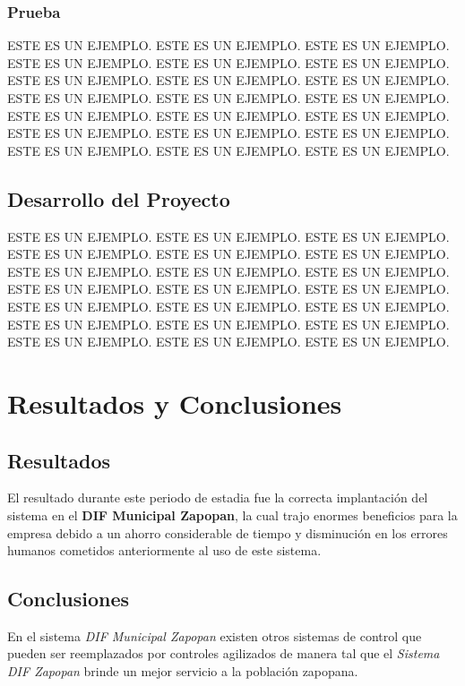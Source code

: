 \documentclass[12pt,spanish]{report}
\begin{document}
\subsection{Prueba}
ESTE ES UN EJEMPLO. ESTE ES UN EJEMPLO. ESTE ES UN EJEMPLO.
ESTE ES UN EJEMPLO. ESTE ES UN EJEMPLO. ESTE ES UN EJEMPLO.
ESTE ES UN EJEMPLO. ESTE ES UN EJEMPLO. ESTE ES UN EJEMPLO.
ESTE ES UN EJEMPLO. ESTE ES UN EJEMPLO. ESTE ES UN EJEMPLO.
ESTE ES UN EJEMPLO. ESTE ES UN EJEMPLO. ESTE ES UN EJEMPLO.
ESTE ES UN EJEMPLO. ESTE ES UN EJEMPLO. ESTE ES UN EJEMPLO.
ESTE ES UN EJEMPLO. ESTE ES UN EJEMPLO. ESTE ES UN EJEMPLO.

\section{Desarrollo del Proyecto}
ESTE ES UN EJEMPLO. ESTE ES UN EJEMPLO. ESTE ES UN EJEMPLO.
ESTE ES UN EJEMPLO. ESTE ES UN EJEMPLO. ESTE ES UN EJEMPLO.
ESTE ES UN EJEMPLO. ESTE ES UN EJEMPLO. ESTE ES UN EJEMPLO.
ESTE ES UN EJEMPLO. ESTE ES UN EJEMPLO. ESTE ES UN EJEMPLO.
ESTE ES UN EJEMPLO. ESTE ES UN EJEMPLO. ESTE ES UN EJEMPLO.
ESTE ES UN EJEMPLO. ESTE ES UN EJEMPLO. ESTE ES UN EJEMPLO.
ESTE ES UN EJEMPLO. ESTE ES UN EJEMPLO. ESTE ES UN EJEMPLO.
\newpage

\chapter{Resultados y Conclusiones}
\newpage

\section{Resultados}

El resultado durante este periodo de estadia fue la correcta implantaci\'on del sistema en el \textbf{DIF Municipal Zapopan}, la cual trajo enormes beneficios para la empresa debido a un ahorro considerable de tiempo y disminuci\'on en los errores humanos cometidos anteriormente al uso de este sistema.

\section{Conclusiones}

En el sistema \emph{DIF Municipal Zapopan} existen otros sistemas de control que pueden ser reemplazados por controles agilizados de manera tal que el \emph{Sistema DIF Zapopan} brinde un mejor servicio a la poblaci\'on zapopana.\\
\end{document}
